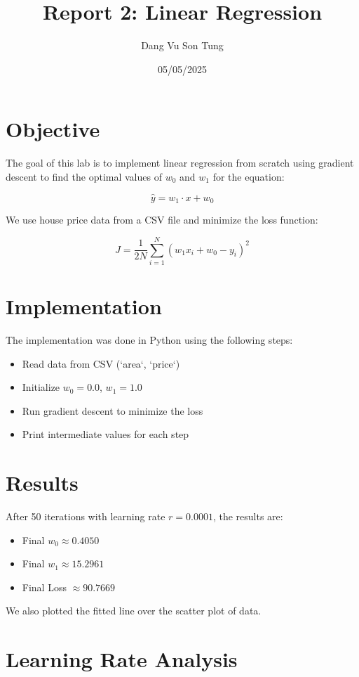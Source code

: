\documentclass{article}
\title{Report 2: Linear Regression}
\author{Dang Vu Son Tung}
\date{05/05/2025}
\begin{document}
\maketitle

\section*{Objective}

The goal of this lab is to implement linear regression from scratch using gradient descent to find the optimal values of $w_0$ and $w_1$ for the equation:

\[
\hat{y} = w_1 \cdot x + w_0
\]

We use house price data from a CSV file and minimize the loss function:

\[
J = \frac{1}{2N} \sum_{i=1}^N (w_1 x_i + w_0 - y_i)^2
\]

\section*{Implementation}

The implementation was done in Python using the following steps:

\begin{itemize}
    \item Read data from CSV (`area`, `price`)
    \item Initialize $w_0 = 0.0$, $w_1 = 1.0$
    \item Run gradient descent to minimize the loss
    \item Print intermediate values for each step
\end{itemize}

\section*{Results}

After 50 iterations with learning rate $r = 0.0001$, the results are:

\begin{itemize}
    \item Final $w_0 \approx 0.4050$
    \item Final $w_1 \approx 15.2961$
    \item Final Loss $\approx 90.7669$
\end{itemize}

We also plotted the fitted line over the scatter plot of data.

\section*{Learning Rate Analysis}
\end{document}
